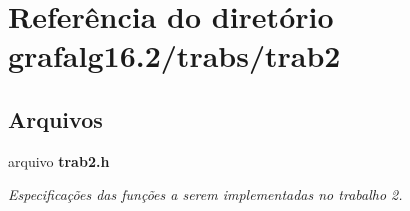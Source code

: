 \section{Referência do diretório grafalg16.2/trabs/trab2}
\label{dir_46615559ea697cb0494aae89d0e46841}
\subsection*{Arquivos}
\begin{DoxyCompactItemize}
\item 
arquivo {\bf trab2.\+h}
\begin{DoxyCompactList}\small\item\em Especificações das funções a serem implementadas no trabalho 2. \end{DoxyCompactList}\end{DoxyCompactItemize}
